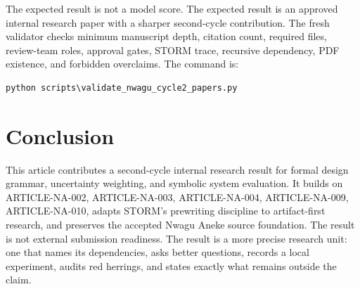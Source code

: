 \documentclass[sigconf,nonacm]{acmart}
\begin{document}
The expected result is not a model score. The expected result is an approved
internal research paper with a sharper second-cycle contribution. The fresh
validator checks minimum manuscript depth, citation count, required files,
review-team roles, approval gates, STORM trace, recursive dependency, PDF
existence, and forbidden overclaims. The command is:
\begin{verbatim}
python scripts\validate_nwagu_cycle2_papers.py
\end{verbatim}

\section{Conclusion}
This article contributes a second-cycle internal research result for formal design grammar, uncertainty weighting, and symbolic system evaluation. It
builds on ARTICLE-NA-002, ARTICLE-NA-003, ARTICLE-NA-004, ARTICLE-NA-009, ARTICLE-NA-010, adapts STORM's prewriting discipline to artifact-first
research, and preserves the accepted Nwagu Aneke source foundation. The result
is not external submission readiness. The result is a more precise research unit:
one that names its dependencies, asks better questions, records a local
experiment, audits red herrings, and states exactly what remains outside the
claim.



\end{document}
